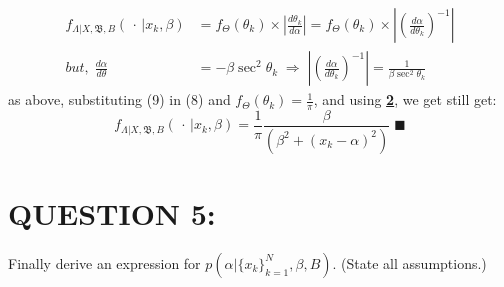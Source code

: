 \documentclass[a4paper,11pt]{article}
\begin{document}
\begin{align}
	f_{\Lambda | X, \mathfrak{B},B} (\, \cdot \, | x_k, \beta) &= f_\Theta (\theta_k) \times \left| \frac{d\theta_k}{d\alpha} \right| = f_\Theta (\theta_k) \times \left| \left(\frac{d\alpha}{d\theta_k} \right)^{-1} \right| \\
	but, \; \frac{d\alpha}{d\theta} &= -\beta \sec^2 \theta_k \; \Rightarrow \; \left| \left(\frac{d\alpha}{d\theta_k} \right)^{-1} \right| = \frac{1}{\beta \sec^2 \theta_k}
\end{align}
as above, substituting (9) in (8) and $f_\Theta (\theta_k) = \frac{1}{\pi}$, and using \hyperref[sec:proof]{\textbf{2}}, we get still get:
\begin{equation}
	f_{\Lambda | X, \mathfrak{B},B} (\, \cdot \, | x_k, \beta) = \frac{1}{\pi} \frac{\beta}{(\beta^2 + (x_k - \alpha)^2)} \; \blacksquare
\end{equation}

\section{QUESTION 5:}
Finally derive an expression for $p(\alpha | \{x_k\}^N _{k = 1}, \beta, B)$. (State all assumptions.)
\end{document}
